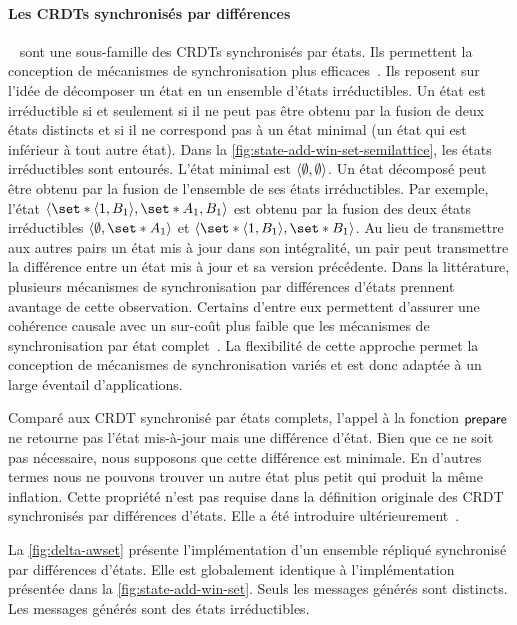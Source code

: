 \paragraph{Les \acp{CRDT} synchronisés par différences}~\autocite{almeida_2018_delta-crdt-revisited} sont une sous-famille des \acp{CRDT} synchronisés par états.
Ils permettent la conception de mécanismes de synchronisation plus efficaces~\autocite{enes_2018_efficient-sync-state-based-crdt}.
Ils reposent sur l'idée de décomposer un état en un ensemble d'états irréductibles.
Un état est irréductible si et seulement si il ne peut pas être obtenu par la fusion de deux états distincts et si il ne correspond pas à un état minimal (un état qui est inférieur à tout autre état).
Dans la \autoref{fig:state-add-win-set-semilattice}, les états irréductibles sont entourés.
L'état minimal est $\tuple*{\emptyset, \emptyset}$.
Un état décomposé peut être obtenu par la fusion de l'ensemble de ses états irréductibles.
Par exemple, l'état $\tuple*{\set*{\tuple*{1,B_1}}, \set*{A_1,B_1}}$ est obtenu par la fusion des deux états irréductibles $\tuple*{\emptyset, \set*{A_1}}$ et $\tuple*{\set*{\tuple*{1,B_1}}, \set*{B_1}}$.
Au lieu de transmettre aux autres pairs un état mis à jour dans son intégralité, un pair peut transmettre la différence entre un état mis à jour et sa version précédente.
Dans la littérature, plusieurs mécanismes de synchronisation par différences d'états prennent avantage de cette observation.
Certains d'entre eux permettent d'assurer une cohérence causale avec un sur-coût plus faible que les mécanismes de synchronisation par état complet~\autocite{enes_2018_efficient-sync-state-based-crdt}.
La flexibilité de cette approche permet la conception de mécanismes de synchronisation variés et est donc adaptée à un large éventail d'applications.

Comparé aux \ac{CRDT} synchronisé par états complets, l'appel à la fonction $\trm{prepare}$ ne retourne pas l'état mis-à-jour mais une différence d'état.
Bien que ce ne soit pas nécessaire, nous supposons que cette différence est minimale.
En d'autres termes nous ne pouvons trouver un autre état plus petit qui produit la même inflation.
Cette propriété n'est pas requise dans la définition originale des \ac{CRDT} synchronisés par différences d'états.
Elle a été introduire ultérieurement~\autocite{enes_2018_efficient-sync-state-based-crdt}.

La \autoref{fig:delta-awset} présente l'implémentation d'un ensemble répliqué synchronisé par différences d'états.
Elle est globalement identique à l'implémentation présentée dans la \autoref{fig:state-add-win-set}.
Seuls les messages générés sont distincts.
Les messages générés sont des états irréductibles.

